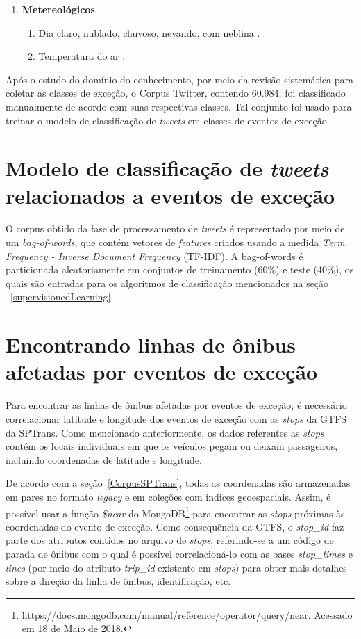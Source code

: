\documentclass[
	12pt,				%
	oneside,			%
	a4paper,			%
	english,			%
	brazil				%
	]{abntex2ppgsi}
\begin{document}
{{\begin{enumerate}
\item \textbf{Metereológicos}.
\begin{enumerate}
\item Dia claro, nublado, chuvoso, nevando, com neblina \cite{Chen2016}.
\item Temperatura do ar \cite{Chen2016}.
\end{enumerate}
\end{enumerate}

Após o estudo do domínio do conhecimento, por meio da revisão sistemática para coletar as classes de exceção, o Corpus Twitter, contendo 60.984, foi classificado manualmente de acordo com suas respectivas classes. Tal conjunto foi usado para treinar o modelo de classificação de \textit{tweets} em classes de eventos de exceção. 

\section{Modelo de classificação de \textit{tweets} relacionados a eventos de exceção}
\label{model}

O corpus obtido da fase de processamento de \textit {tweets} é representado por meio de um \textit{bag-of-words}, que contém vetores de \textit{features} criados usando a medida \textit{Term Frequency - Inverse Document Frequency} (TF-IDF). A bag-of-words é particionada aleatoriamente em conjuntos de treinamento (60\%) e teste (40\%), os quais são entradas para os algoritmos de classificação mencionados na seção ~\ref{supervisionedLearning}.

\section{Encontrando linhas de ônibus afetadas por eventos de exceção}

Para encontrar as linhas de ônibus afetadas por eventos de exceção, é necessário correlacionar latitude e longitude dos eventos de exceção com as \textit{stops} da GTFS da SPTrans. Como mencionado anteriormente, os dados referentes as \textit{stops} contém os locais individuais em que os veículos pegam ou deixam passageiros, incluindo coordenadas de latitude e longitude.

De acordo com a seção~\ref{CorpusSPTrans}, todas as coordenadas são armazenadas em pares no formato \textit{legacy} e em coleções com índices geoespaciais. Assim, é possível usar a função \textit{\$near} do MongoDB\footnote {\url{https://docs.mongodb.com/manual/reference/operator/query/near}. Acessado em 18 de Maio de 2018.} para encontrar as \textit{stops} próximas às coordenadas do evento de exceção. Como consequência da GTFS, o \textit{stop\_id} faz parte dos atributos contidos no arquivo de \textit{stops}, referindo-se a um código de parada de ônibus com o qual é possível correlacioná-lo com as bases \textit{stop\_times} e \textit{lines} (por meio do atributo \textit{trip\_id} existente em \textit{stops}) para obter mais detalhes sobre a direção da linha de ônibus, identificação, etc.

}}
\end{document}
